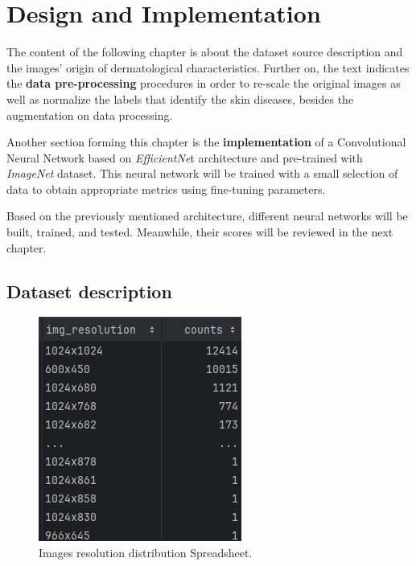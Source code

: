 \chapter{Design and Implementation}
\label{chapter: Design and implementation}
The content of the following chapter is about the dataset source description and the images' origin of dermatological characteristics. Further on, the text indicates the \textbf{data pre-processing} procedures in order to re-scale the original images as well as normalize the labels that identify the skin diseases,  besides the augmentation on data processing. 

Another section forming this chapter is the\textbf{ implementation} of a Convolutional Neural Network based on \textit{EfficientNe}t architecture and pre-trained with \textit{ImageNet} dataset. This neural network will be trained with a small selection of data to obtain appropriate metrics using fine-tuning parameters.

Based on the previously mentioned architecture, different neural networks will be built, trained, and tested. Meanwhile, their scores will be reviewed in the next chapter. 


\section{Dataset description}

\begin{figure} 
    \vspace{-20pt}
    \centering
        \includegraphics[scale=0.75 ]{images/Building/resolution_list.png}
        \caption{Images resolution distribution Spreadsheet.}
    \label{fig:Spreadsheet_resolution_images}
    \vspace{-100pt}
\end{figure}

